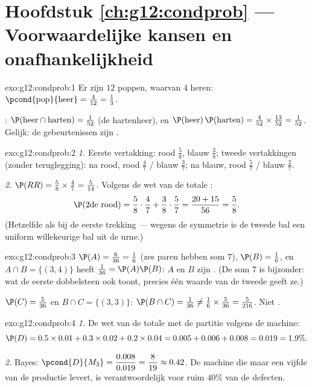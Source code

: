 \section*{Hoofdstuk \ref{ch:g12:condprob} --- Voorwaardelijke kansen en onafhankelijkheid}

\begin{solution}{exo:g12:condprob:1}
Er zijn $12$ poppen, waarvan $4$ heren:
$\pcond{\text{pop}}{\text{heer}} = \frac{4}{12} = \frac13$.

: $\P(\text{heer} \cap \text{harten}) = \frac{1}{52}$ (de
hartenheer), en
$\P(\text{heer})\,\P(\text{harten}) = \frac{4}{52}\times\frac{13}{52}
= \frac{1}{52}$. Gelijk: de gebeurtenissen zijn .
\end{solution}

\begin{solution}{exo:g12:condprob:2}
\emph{1.} Eerste vertakking: rood $\frac58$, blauw $\frac38$; tweede
vertakkingen (zonder teruglegging): na rood, rood $\frac47$ / blauw
$\frac37$; na blauw, rood $\frac57$ / blauw $\frac27$.

\emph{2.} $\P(RR) = \frac58 \times \frac47 = \frac{5}{14}$. Volgens de wet van
de totale :
\[
\P(\text{2de rood}) = \frac58\cdot\frac47 + \frac38\cdot\frac57
= \frac{20 + 15}{56} = \frac58 .
\]
(Hetzelfde als bij de eerste trekking --- wegens de symmetrie is de tweede bal
een uniform willekeurige bal uit de urne.)
\end{solution}

\begin{solution}{exo:g12:condprob:3}
$\P(A) = \frac{6}{36} = \frac16$ (zes paren hebben som $7$),
$\P(B) = \frac16$, en $A \cap B = \{(3,4)\}$ heeft 
$\frac{1}{36} = \P(A)\P(B)$: $A$ en $B$ zijn . (De som $7$ is
bijzonder: wat de eerste dobbelsteen ook toont, precies één waarde van de
tweede geeft ze.)

$\P(C) = \frac{5}{36}$ en $B \cap C = \{(3,3)\}$:
$\P(B \cap C) = \frac{1}{36} \neq \frac16 \times \frac{5}{36}
= \frac{5}{216}$. Niet .
\end{solution}

\begin{solution}{exo:g12:condprob:4}
\emph{1.} De wet van de totale  met de partitie volgens de machine:
\[
\P(D) = 0.5\times0.01 + 0.3\times0.02 + 0.2\times0.04
= 0.005 + 0.006 + 0.008 = 0.019 = 1.9\% .
\]

\emph{2.} Bayes: $\pcond{D}{M_3} = \dfrac{0.008}{0.019} = \dfrac{8}{19}
\approx 0.42$. De machine die maar een vijfde van de productie levert, is
verantwoordelijk voor ruim $40\%$ van de defecten.
\end{solution}

